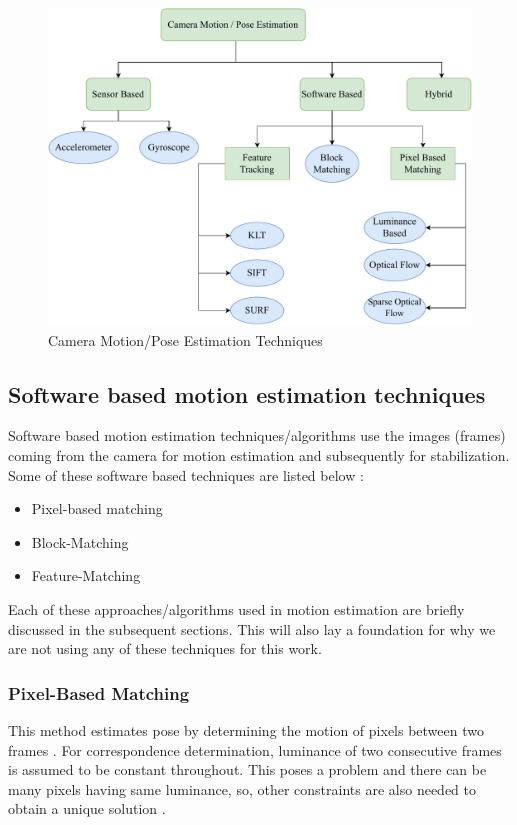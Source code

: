 \begin{figure}[H]
\centering
\includegraphics[scale=0.6]{images/fig_chapter2/cam_pose_estimation.pdf}
\caption{Camera Motion/Pose Estimation Techniques}
\label{fig:cam_pose_est}
\end{figure}


\subsection{Software based motion estimation techniques}
Software based motion estimation techniques/algorithms use the images (frames) coming from the camera for motion estimation and subsequently for stabilization. Some of these software based techniques are listed below \citep{dis_review}:

\begin{itemize}
\item Pixel-based matching
\item Block-Matching
\item Feature-Matching
\end{itemize}

Each of these approaches/algorithms used in motion estimation are briefly discussed in the subsequent sections. This will also lay a foundation for why we are not using any of these techniques for this work.

\subsubsection{Pixel-Based Matching}
This method estimates pose by determining the motion of pixels between two frames \citep{dis_review}. For correspondence determination, luminance of two consecutive frames is assumed to be constant throughout. This poses a problem and there can be many pixels having same luminance, so, other constraints are also needed to obtain a unique solution \citep{dis_review}. 

